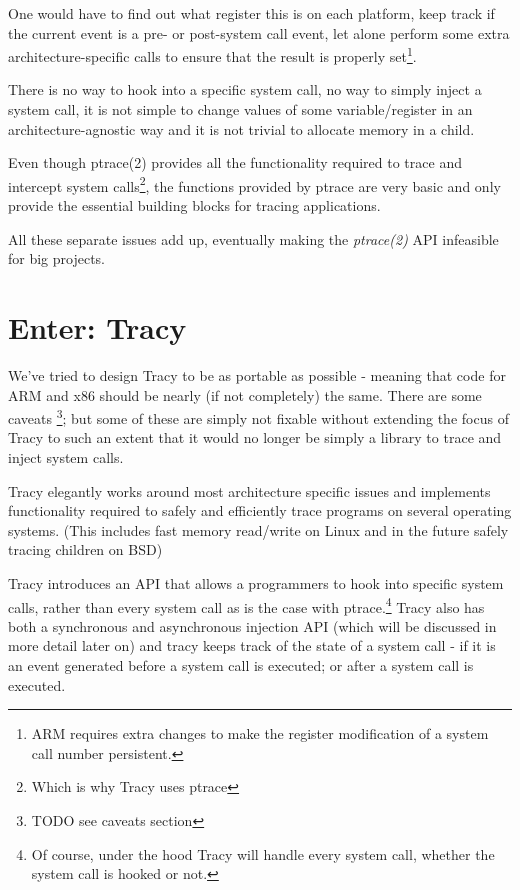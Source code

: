 \documentclass[a4paper, twoside, 10pt, twocolumn]{report}
\begin{document}
One would have to find out what register this is on each platform,
keep track if the current event is a pre- or post-system call event, let alone
perform some extra architecture-specific calls to ensure that the result is
properly set\footnote{ARM requires extra changes to make the register
modification of a system call number persistent.}.

There is no way to hook into a specific system call, no way
to simply inject a system call, it is not simple to change values of some
variable/register in an architecture-agnostic way and it is not trivial
to allocate memory in a child.

Even though ptrace(2) provides all the functionality required to trace and
intercept system calls\footnote{Which is why Tracy uses ptrace},
the functions provided by ptrace are very basic and only provide the
essential building blocks for tracing applications.

All these separate issues add up, eventually making the \textit{ptrace(2)} API
infeasible for big projects.

\section{Enter: Tracy}

We've tried to design Tracy to be as portable as possible - meaning that code
for ARM and x86 should be nearly (if not completely) the same. There are some
caveats \footnote{TODO see caveats section}; but some of these are simply not
fixable without extending the focus of Tracy to such an extent that it would no
longer be simply a library to trace and inject system calls.

Tracy elegantly works around most architecture specific issues and implements
functionality required to safely and efficiently trace programs on several
operating systems. (This includes fast memory read/write on Linux
and in the future safely tracing children on BSD)

Tracy introduces an API that allows a programmers to hook into specific system
calls, rather than every system call as is the case with ptrace.\footnote{Of
course, under the hood Tracy will handle every system call, whether the system
call is hooked or not.}
Tracy also has both a synchronous and asynchronous injection API (which
will be discussed in more detail later on) and tracy keeps track of the state of
a system call - if it is an event generated before a system call is executed; or
after a system call is executed.
\end{document}
